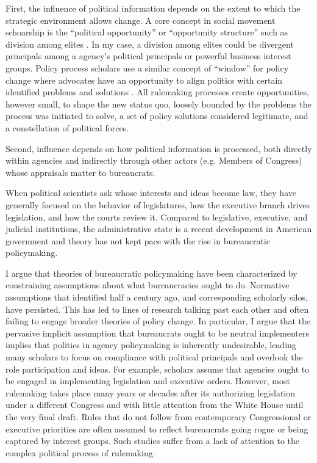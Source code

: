 First, the influence of political information depends on the extent to which the strategic environment allows change. A core concept in social movement schoarship is the ``political opportunity'' or ``opportunity structure'' \citep{Mcadam2017} such as division among elites \citep{Tarrow1994}. In my case, a division among elites could be divergent principals among a agency's political principals or powerful business interest groups. Policy process scholars use a similar concept of ``window'' for policy change where advocates have an opportunity to align politics with certain identified problems and solutions  \citep{Kingdon1984}. All rulemaking processes create opportunities, however small, to shape the new status quo, loosely bounded by the problems the process was initiated to solve, a set of policy solutions considered legitimate, and a constellation of political forces.

Second, influence depends on how political information is processed, both directly within agencies and indirectly through other actors (e.g. Members of Congress) whose appraisals matter to bureaucrats.

When political scientists ask whose interests and ideas become law, they have generally focused on the behavior of legislatures, how the executive branch drives legislation, and how the courts review it. Compared to legislative, executive, and judicial institutions, the administrative state is a recent development in American government and theory has not kept pace with the rise in bureaucratic policymaking. 

I argue that theories of bureaucratic policymaking have been characterized by constraining assumptions about what bureaucracies ought to do.  Normative assumptions that \citet{Wilson1967} identified half a century ago, and corresponding scholarly silos, have persisted. This has led to lines of research talking past each other and often failing to engage broader theories of policy change. In particular, I argue that the pervasive implicit assumption that bureaucrats ought to be neutral implementers implies that politics in agency policymaking is inherently undesirable, leading many scholars to focus on compliance with political principals and overlook the role participation and ideas. For example, scholars assume that agencies ought to be engaged in implementing legislation and executive orders. However, most rulemaking takes place many years or decades after its authorizing legislation under a different Congress and with little attention from the White House until the very final draft. Rules that do not follow from contemporary Congressional or executive priorities are often assumed to reflect bureaucrats going rogue or being captured by interest groups. Such studies suffer from a lack of attention to the complex political process of rulemaking. 


